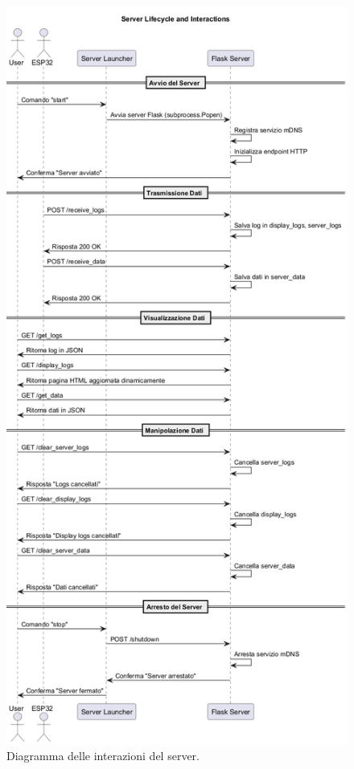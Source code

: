 \begin{figure}[h!]
    \centering
    \includegraphics[width=\textwidth]{diagrams/server_lifecycle_interactions.png}
    \caption{Diagramma delle interazioni del server.}
    \label{fig:server_lifecycle_interactions}
\end{figure}


